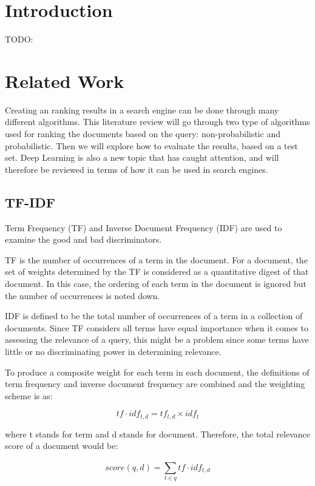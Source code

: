 \section{Introduction}

TODO:

\section{Related Work}
Creating an ranking results in a search engine can be done through many different algorithms. This literature review will go through two type of algorithms used for ranking the documents based on the query: non-probabilistic and probabilistic. Then we will explore how to evaluate the results, based on a test set. Deep Learning is also a new topic that has caught attention, and will therefore be reviewed in terms of how it can be used in search engines.

\subsection{TF-IDF} %
\label{sub:tf_idf}

Term Frequency (TF) and Inverse Document Frequency (IDF)  are used to examine the good and bad discriminators. 

TF is the number of occurrences of a term in the document. For a document, the set of weights determined by the TF is considered as a quantitative digest of that document. In this case, the ordering of each term in the document is ignored but the number of occurrences is noted down.

IDF is defined to be the total number of occurrences of a term in a collection of documents. Since TF considers all terms have equal importance when it comes to assessing the relevance of a query, this might be a problem since some terms have little or no discriminating power in determining relevance.

To produce a composite weight for each term in each document, the definitions of term frequency and inverse document frequency are combined and the weighting scheme is as:

\[tf\cdot idf_{t,d}=tf_{t,d}\times idf_{t}\]

where t stands for term and d stands for document. Therefore, the total relevance score of a document would be:

\[score(q,d)=\sum_{t\in q}^{} tf\cdot idf_{t,d}\]



